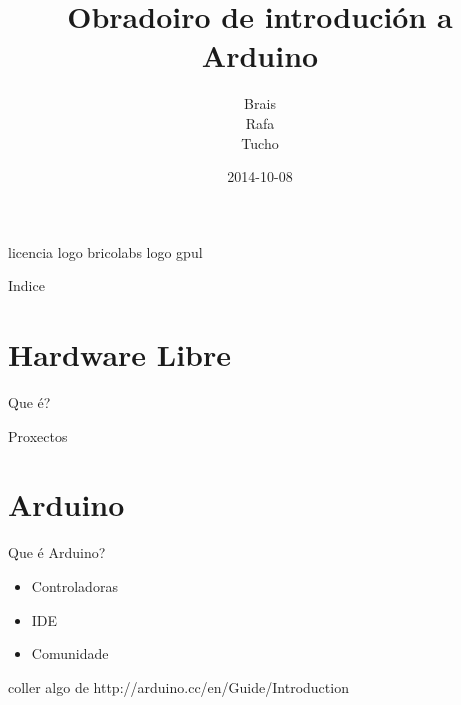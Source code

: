 \documentclass{beamer}
\title{Obradoiro de introdución a Arduino}
\author[Brais, Rafa, Tucho]{ Brais \\ Rafa \\ Tucho}
\date{2014-10-08}
\begin{document}
\begin{frame}
\titlepage

licencia
logo bricolabs
logo gpul
\end{frame}

\begin{frame}{Indice}
  \tableofcontents
\end{frame}


\section{Hardware Libre}
\begin{frame}
\huge{\centerline{\textbf{\color{blue} \insertsection}}}
\end{frame}

\begin{frame}{Que é?}

\end{frame}

\begin{frame}{Proxectos}

\end{frame}



\section{Arduino}
\begin{frame}
\huge{\centerline{\textbf{\color{blue} \insertsection}}}
\end{frame}

\begin{frame}{Que é Arduino?}
\begin{itemize}
 \item Controladoras
 \item IDE
 \item Comunidade
\end{itemize}

coller algo de http://arduino.cc/en/Guide/Introduction
\end{frame}
\end{document}
